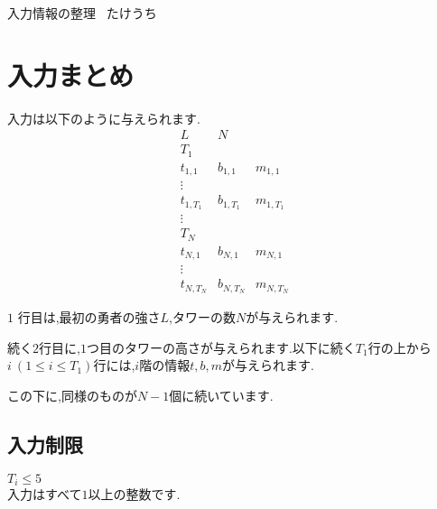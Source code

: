 \documentclass[a4paper,10pt]{ltjsarticle}
\begin{document}
\begin{center}
  {\LARGE 入力情報の整理}\
  \vskip6.5pt
  {\large たけうち}\
  \vskip2pt
  {\large }
\end{center}
\section*{入力まとめ}
入力は以下のように与えられます.
\begin{equation*}
  \begin{array}{ccc}
    L & N &  \\
    T_1 &  & \\
    t_{1,1} & b_{1,1} & m_{1,1} \\
    \vdots && \\
    t_{1, T_1} & b_{1, T_1} & m_{1, T_1}\\
    \vdots \\
    T_N \\
    t_{N,1} & b_{N,1} & m_{N,1}\\
    \vdots \\
    t_{N, T_N} & b_{N, T_N} & m_{N, T_N}
  \end{array}
\end{equation*}


$1$ 行目は,最初の勇者の強さ$L$,タワーの数$N$が与えられます.

続く$2$行目に,$1$つ目のタワーの高さが与えられます.以下に続く$T_1$行の上から$i\ (1\leq i \leq T_1)$行には,$i$階の情報$t,b,m$が与えられます.

この下に,同様のものが$N-1$個に続いています.

\subsection*{入力制限}
$T_i \leq 5$\\
入力はすべて$1$以上の整数です.
\end{document}
